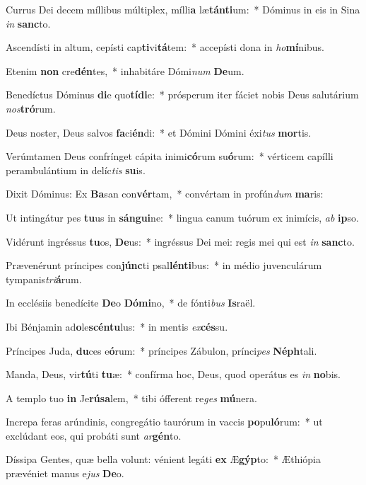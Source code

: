 \item Currus Dei decem míllibus múltiplex, mílli\textbf{a} læ\textbf{tán}\textbf{ti}um:~* Dóminus in eis in Sina \textit{in} \textbf{sanc}to.
\item Ascendísti in altum, cepísti cap\textbf{ti}vi\textbf{tá}tem:~* accepísti dona in \textit{ho}\textbf{mí}nibus.
\item Etenim \textbf{non} cre\textbf{dén}tes,~* inhabitáre Dómi\textit{num} \textbf{De}um.
\item Benedíctus Dóminus \textbf{di}e quo\textbf{tí}\textbf{di}e:~* prósperum iter fáciet nobis Deus salutárium \textit{nos}\textbf{tró}rum.
\item Deus noster, Deus salvos \textbf{fa}ci\textbf{én}di:~* et Dómini Dómini éxi\textit{tus} \textbf{mor}tis.
\item Verúmtamen Deus confrínget cápita inimi\textbf{có}rum su\textbf{ó}rum:~* vérticem capílli perambulántium in delíc\textit{tis} \textbf{su}is.
\item Dixit Dóminus: Ex \textbf{Ba}san con\textbf{vér}tam,~* convértam in profún\textit{dum} \textbf{ma}ris:
\item Ut intingátur pes \textbf{tu}us in \textbf{sán}\textbf{gui}ne:~* lingua canum tuórum ex inimícis, \textit{ab} \textbf{ip}so.
\item Vidérunt ingréssus \textbf{tu}os, \textbf{De}us:~* ingréssus Dei mei: regis mei qui est \textit{in} \textbf{sanc}to.
\item Prævenérunt príncipes con\textbf{júnc}ti psal\textbf{lén}\textbf{ti}bus:~* in médio juvenculárum tympanis\textit{tri}\textbf{á}rum.
\item In ecclésiis benedícite \textbf{De}o \textbf{Dó}\textbf{mi}no,~* de fónti\textit{bus} \textbf{Is}raël.
\item Ibi Bénjamin ad\textbf{o}le\textbf{scén}\textbf{tu}lus:~* in mentis \textit{ex}\textbf{cés}su.
\item Príncipes Juda, \textbf{du}ces e\textbf{ó}rum:~* príncipes Zábulon, prínci\textit{pes} \textbf{Néph}tali.
\item Manda, Deus, vir\textbf{tú}ti \textbf{tu}æ:~* confírma hoc, Deus, quod operátus es \textit{in} \textbf{no}bis.
\item A templo tuo \textbf{in} Je\textbf{rú}\textbf{sa}lem,~* tibi ófferent re\textit{ges} \textbf{mú}nera.
\item Increpa feras arúndinis, congregátio taurórum in vaccis \textbf{po}pu\textbf{ló}rum:~* ut exclúdant eos, qui probáti sunt \textit{ar}\textbf{gén}to.
\item Díssipa Gentes, quæ bella volunt: vénient legáti \textbf{ex} Æ\textbf{gýp}to:~* Æthiópia prævéniet manus e\textit{jus} \textbf{De}o.
